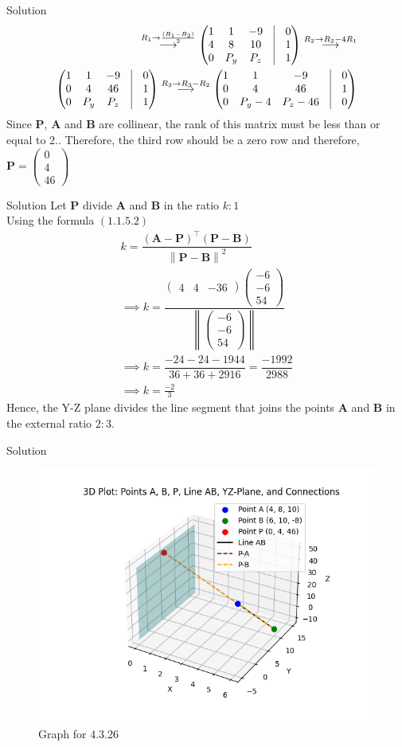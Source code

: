 \documentclass{beamer}
\let\vec\mathbf
\providecommand{\brak}[1]{\ensuremath{\left(#1\right)}}
\theoremstyle{remark}
\providecommand{\norm}[1]{\left\lVert#1\right\rVert}
\newcommand{\myvec}[1]{\ensuremath{\begin{pmatrix}#1\end{pmatrix}}}
\begin{document}
\begin{frame}{Solution}
\begin{align}
    \overset{R_1 \rightarrow \frac{\brak{R_1 - R_2}}{2}}{\longrightarrow} \myvec{1&1&-9&\vrule&0\\4&8&10&\vrule&1\\0&P_y&P_z&\vrule&1}
    \overset{R_2 \rightarrow R_2 - 4R_1}{\longrightarrow} \\ \myvec{1&1&-9&\vrule&0\\0&4&46&\vrule&1\\0&P_y&P_z&\vrule&1}\overset{R_3 \rightarrow R_3 - R_2}{\longrightarrow} \myvec{1&1&-9&\vrule&0\\0&4&46&\vrule&1\\0&P_y-4&P_z-46&\vrule&0}
\end{align}
Since $\vec{P}$, $\vec{A}$ and $\vec{B}$ are collinear, the rank of this matrix must be less than or equal to 2.. Therefore, the third row should be a zero row and therefore, $\vec{P}=\myvec{0 \\ 4 \\ 46}$
\end{frame}
\begin{frame}{Solution}
Let $\vec{P}$ divide $\vec{A}$ and $\vec{B}$ in the ratio $k:1$\\
Using the formula \brak{1.1.5.2}
\begin{align}
    k=\dfrac{\brak{\vec{A}-\vec{P}}^{\top} \brak{\vec{P}-\vec{B}}}{\norm{\vec{P}-\vec{B}}^2}\\
    \implies k=\dfrac{\myvec{4 & 4 & -36} \myvec{-6 \\ -6 \\ 54}}{\norm{\myvec{-6 \\ -6 \\ 54}}}\\
    \implies k= \dfrac{-24 -24 -1944}{36 + 36 + 2916} = \dfrac{-1992}{2988}\\
    \implies k= \frac{-2}{3}
\end{align}
Hence, the Y-Z plane divides the line segment that joins the points $\vec{A}$ and $\vec{B}$ in the external ratio $2:3$.
\end{frame}
\begin{frame}{Solution}
    \begin{figure}[H]
        \centering
        \includegraphics[width=0.9\columnwidth]{figs/1.png}
        \caption{Graph for 4.3.26}
        \label{fig:placeholder}
    \end{figure}
\end{frame}
\end{document}
